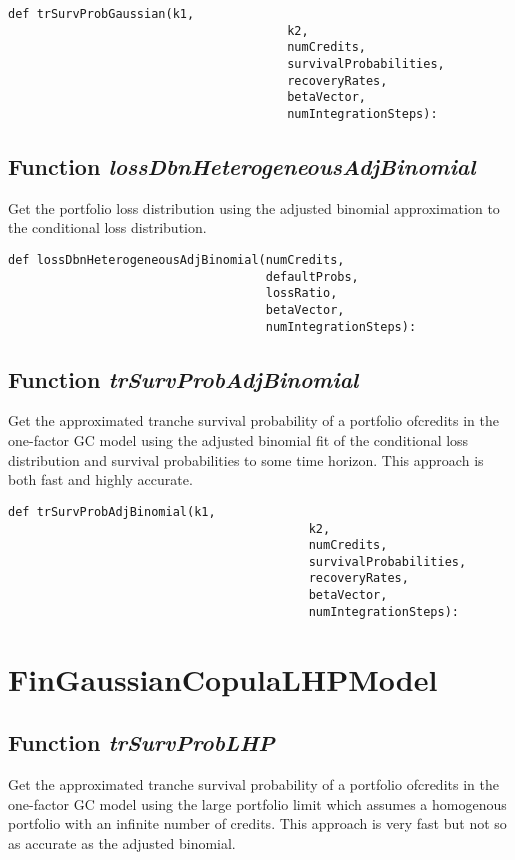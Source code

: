 \documentclass[twoside,11pt]{book}
\begin{document}
\begin{lstlisting}
def trSurvProbGaussian(k1,
                                       k2,
                                       numCredits,
                                       survivalProbabilities,
                                       recoveryRates,
                                       betaVector,
                                       numIntegrationSteps):
\end{lstlisting}

\subsection{Function {\it lossDbnHeterogeneousAdjBinomial}}
Get the portfolio loss distribution using the adjusted binomial approximation to the conditional loss distribution. 

\begin{lstlisting}
def lossDbnHeterogeneousAdjBinomial(numCredits, 
                                    defaultProbs, 
                                    lossRatio,
                                    betaVector,
                                    numIntegrationSteps):
\end{lstlisting}

\subsection{Function {\it trSurvProbAdjBinomial}}
Get the approximated tranche survival probability of a portfolio ofcredits in the one-factor GC model using the adjusted binomial fit of the conditional loss distribution and survival probabilities to some time horizon. This approach is both fast and highly accurate. 

\begin{lstlisting}
def trSurvProbAdjBinomial(k1, 
                                          k2, 
                                          numCredits,
                                          survivalProbabilities, 
                                          recoveryRates, 
                                          betaVector,
                                          numIntegrationSteps):
\end{lstlisting}

\newpage
\section{FinGaussianCopulaLHPModel}

\subsection{Function {\it trSurvProbLHP}}
Get the approximated tranche survival probability of a portfolio ofcredits in the one-factor GC model using the large portfolio limit which assumes a homogenous portfolio with an infinite number of credits. This approach is very fast but not so as accurate as the adjusted binomial. 
\end{document}
